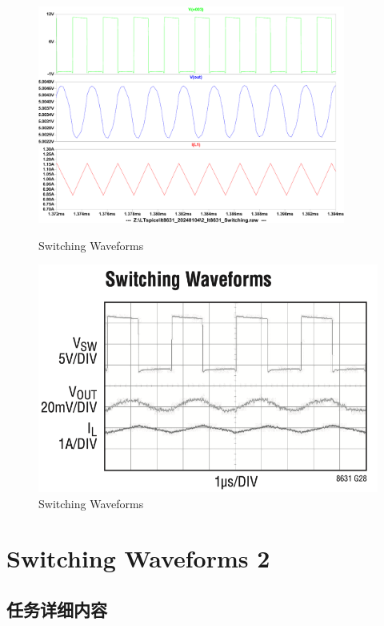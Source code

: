 \documentclass[lang=cn,10pt]{elegantbook}
\begin{document}
\begin{figure}[htbp]
    \centering\begin{minipage}[t]{0.48\textwidth}
        \centering\includegraphics[page=1, width=0.9\textwidth]{figure/2_lt8631_Switching_2.pdf}
        \caption{Switching Waveforms}
    \end{minipage}
    \centering\begin{minipage}[t]{0.48\textwidth}
        \centering\includegraphics[width=0.9\linewidth]{figure/datasheet_G28.png}
        \caption{Switching Waveforms}
    \end{minipage}
\end{figure}

\section{Switching Waveforms 2}

\subsection{任务详细内容}
\end{document}
